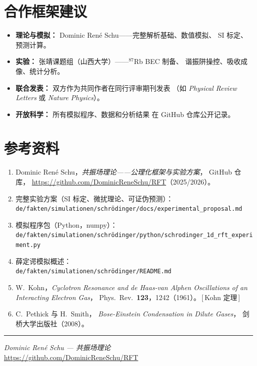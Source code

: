 \documentclass[a4paper,11pt]{article}
\begin{document}
\section{合作框架建议}

\begin{itemize}
  \item \textbf{理论与模拟：}
    Dominic Ren\'e Schu——完整解析基础、数值模拟、
    SI 标定、预测计算。
  \item \textbf{实验：}
    张靖课题组（山西大学）——$^{87}$Rb BEC 制备、
    谐振阱操控、吸收成像、统计分析。
  \item \textbf{联合发表：}
    双方作为共同作者在同行评审期刊发表
    （如 \textit{Physical Review Letters} 或 \textit{Nature Physics}）。
  \item \textbf{开放科学：}
    所有模拟程序、数据和分析结果
    在 GitHub 仓库公开记录。
\end{itemize}

\section{参考资料}

\begin{enumerate}
  \item Dominic Ren\'e Schu，\textit{共振场理论——公理化框架与实验方案}，
    GitHub 仓库，
    \url{https://github.com/DominicReneSchu/RFT}（2025/2026）。
  \item 完整实验方案（SI 标定、微扰理论、可证伪预测）：\\
    \texttt{de/fakten/simulationen/schrödinger/docs/experimental\_proposal.md}
  \item 模拟程序包（Python，numpy）：\\
    \texttt{de/fakten/simulationen/schrödinger/python/schrodinger\_1d\_rft\_experiment.py}
  \item 薛定谔模拟概述：\\
    \texttt{de/fakten/simulationen/schrödinger/README.md}
  \item W.~Kohn，\textit{Cyclotron Resonance and de Haas-van Alphen
    Oscillations of an Interacting Electron Gas}，
    Phys.\ Rev.\ \textbf{123}，1242（1961）。\,[\,Kohn 定理\,]
  \item C.~Pethick 与 H.~Smith，
    \textit{Bose-Einstein Condensation in Dilute Gases}，
    剑桥大学出版社（2008）。
\end{enumerate}

\vspace{2em}
\hrule
\vspace{1em}
\begin{center}
\small
\textit{Dominic Ren\'e Schu --- 共振场理论}\\
\href{https://github.com/DominicReneSchu/RFT}{https://github.com/DominicReneSchu/RFT}
\end{center}
\end{document}
